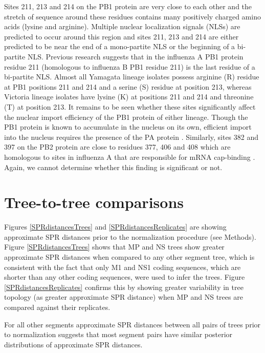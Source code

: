 \documentclass[11pt,oneside,letterpaper]{article}
\begin{document}
Sites 211, 213 and 214 on the PB1 protein are very close to each other and the stretch of sequence around these residues contains many positively charged amino acids (lysine and arginine).
Multiple nuclear localization signals (NLSs) are predicted to occur around this region and sites 211, 213 and 214 are either predicted to be near the end of a mono-partite NLS or the beginning of a bi-partite NLS.
Previous research \cite{nath1990} suggests that in the influenza A PB1 protein residue 211 (homologous to influenza B PB1 residue 211) is the last residue of a bi-partite NLS.
Almost all Yamagata lineage isolates possess arginine (R) residue at PB1 positions 211 and 214 and a serine (S) residue at position 213, whereas Victoria lineage isolates have lysine (K) at positions 211 and 214 and threonine (T) at position 213.
It remains to be seen whether these sites significantly affect the nuclear import efficiency of the PB1 protein of either lineage.
Though the PB1 protein is known to accumulate in the nucleus on its own, efficient import into the nucleus requires the presence of the PA protein \cite{fodor2004}.
Similarly, sites 382 and 397 on the PB2 protein are close to residues 377, 406 and 408 which are homologous to sites in influenza A that are responsible for mRNA cap-binding \cite{guilligay2008}.
Again, we cannot determine whether this finding is significant or not.

\section*{Tree-to-tree comparisons}

Figures \ref{SPRdistancesTrees} and \ref{SPRdistancesReplicates} are showing approximate SPR distances prior to the normalization procedure (see Methods).
Figure \ref{SPRdistancesTrees} shows that MP and NS trees show greater approximate SPR distances when compared to any other segment tree, which is consistent with the fact that only M1 and NS1 coding sequences, which are shorter than any other coding sequences, were used to infer the trees.
Figure \ref{SPRdistancesReplicates} confirms this by showing greater variability in tree topology (as greater approximate SPR distance) when MP and NS trees are compared against their replicates.

For all other segments approximate SPR distances between all pairs of trees prior to normalization suggests that most segment pairs have similar posterior distributions of approximate SPR distances.
\end{document}
